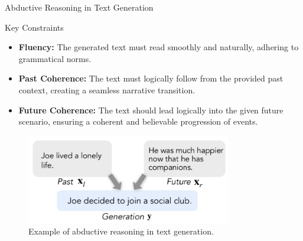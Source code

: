 \documentclass{beamer}
\begin{document}
\begin{frame}{Abductive Reasoning in Text Generation}

    \begin{block}{Key Constraints}
        \begin{itemize}
            \item \textbf{Fluency:} The generated text must read smoothly and naturally, adhering to grammatical norms.
            \item \textbf{Past Coherence:} The text must logically follow from the provided past context, creating a seamless narrative transition.
            \item \textbf{Future Coherence:} The text should lead logically into the given future scenario, ensuring a coherent and believable progression of events.
        \end{itemize}
    \end{block}

    \begin{figure}
        \centering
        \includegraphics[width=0.8\textwidth]{constraint2.png}
        \caption{Example of abductive reasoning in text generation.}
    \end{figure}
\end{frame}
\end{document}
